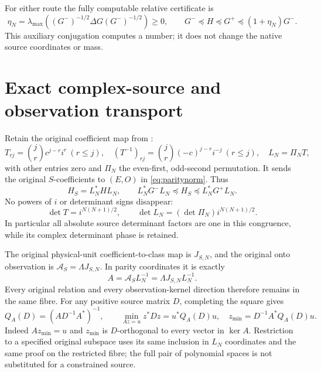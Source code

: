 \documentclass[11pt]{article}
\begin{document}
For either route the fully computable relative certificate is
\begin{equation}\label{eq:eta}
 \eta_N=\lambda_{\max}((G^-)^{-1/2}\Delta G(G^-)^{-1/2})\ge0,
 \qquad G^-\preceq H\preceq G^+\preceq(1+\eta_N)G^-.
\end{equation}
This auxiliary conjugation computes a number; it does not change the
native source coordinates or mass.

\section{Exact complex-source and observation transport}

Retain the original coefficient map from \cite{PP}:
\begin{equation}\label{eq:transport}
 T_{rj}=\binom jr c^{j-r}i^r\ (r\le j),\quad
 (T^{-1})_{rj}=\binom jr(-c)^{j-r}i^{-j}\ (r\le j),\quad
 L_N=\Pi_NT,
\end{equation}
with other entries zero and $\Pi_N$ the even-first, odd-second
permutation.  It sends the original $S$-coefficients to $(E,O)$ in
\eqref{eq:paritynorm}.  Thus
\begin{equation}\label{eq:Sbounds}
 H_S=L_N^*HL_N,\qquad
 L_N^*G^-L_N\preceq H_S\preceq L_N^*G^+L_N.
\end{equation}
No powers of $i$ or determinant signs disappear:
\[
 \det T=i^{N(N+1)/2},\qquad
 \det L_N=(\det\Pi_N)i^{N(N+1)/2}.
\]
In particular all absolute source determinant factors are one in
this congruence, while its complex determinant phase is retained.

The original physical-unit coefficient-to-class map is $J_{S,N}$,
and the original onto observation is $\mathcal A_S=\Lambda J_{S,N}$.
In parity coordinates it is exactly
\begin{equation}\label{eq:A}
 A=\mathcal A_SL_N^{-1}=\Lambda J_{S,N}L_N^{-1}.
\end{equation}
Every original relation and every observation-kernel direction
therefore remains in the same fibre.  For any positive source matrix
$D$, completing the square gives
\begin{equation}\label{eq:minimum}
 Q_A(D)=(AD^{-1}A^*)^{-1},\qquad
 \min_{Az=u}z^*Dz=u^*Q_A(D)u,\quad
 z_{\min}=D^{-1}A^*Q_A(D)u.
\end{equation}
Indeed $Az_{\min}=u$ and $z_{\min}$ is $D$-orthogonal to every
vector in $\ker A$.  Restriction to a specified original subspace
uses its same inclusion in $L_N$ coordinates and the same proof on
the restricted fibre; the full pair of polynomial spaces is not
substituted for a constrained source.
\end{document}

